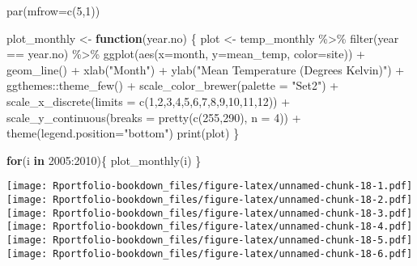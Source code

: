 \documentclass[
]{book}
\newenvironment{Shaded}{\begin{snugshade}}{\end{snugshade}}
\newcommand{\AttributeTok}[1]{\textcolor[rgb]{0.77,0.63,0.00}{#1}}
\newcommand{\ControlFlowTok}[1]{\textcolor[rgb]{0.13,0.29,0.53}{\textbf{#1}}}
\newcommand{\DecValTok}[1]{\textcolor[rgb]{0.00,0.00,0.81}{#1}}
\newcommand{\FunctionTok}[1]{\textcolor[rgb]{0.00,0.00,0.00}{#1}}
\newcommand{\NormalTok}[1]{#1}
\newcommand{\OtherTok}[1]{\textcolor[rgb]{0.56,0.35,0.01}{#1}}
\newcommand{\SpecialCharTok}[1]{\textcolor[rgb]{0.00,0.00,0.00}{#1}}
\newcommand{\StringTok}[1]{\textcolor[rgb]{0.31,0.60,0.02}{#1}}
\begin{document}
\begin{Shaded}
\begin{Highlighting}[]
\FunctionTok{par}\NormalTok{(}\AttributeTok{mfrow=}\FunctionTok{c}\NormalTok{(}\DecValTok{5}\NormalTok{,}\DecValTok{1}\NormalTok{))}

\NormalTok{plot\_monthly }\OtherTok{\textless{}{-}} \ControlFlowTok{function}\NormalTok{(year.no) \{}
\NormalTok{  plot }\OtherTok{\textless{}{-}}\NormalTok{ temp\_monthly }\SpecialCharTok{\%\textgreater{}\%}
    \FunctionTok{filter}\NormalTok{(year }\SpecialCharTok{==}\NormalTok{ year.no) }\SpecialCharTok{\%\textgreater{}\%}
    \FunctionTok{ggplot}\NormalTok{(}\FunctionTok{aes}\NormalTok{(}\AttributeTok{x=}\NormalTok{month, }\AttributeTok{y=}\NormalTok{mean\_temp, }\AttributeTok{color=}\NormalTok{site)) }\SpecialCharTok{+} 
      \FunctionTok{geom\_line}\NormalTok{() }\SpecialCharTok{+}
      \FunctionTok{xlab}\NormalTok{(}\StringTok{"Month"}\NormalTok{) }\SpecialCharTok{+} \FunctionTok{ylab}\NormalTok{(}\StringTok{"Mean Temperature (Degrees Kelvin)"}\NormalTok{) }\SpecialCharTok{+}
\NormalTok{      ggthemes}\SpecialCharTok{::}\FunctionTok{theme\_few}\NormalTok{() }\SpecialCharTok{+} 
      \FunctionTok{scale\_color\_brewer}\NormalTok{(}\AttributeTok{palette =} \StringTok{"Set2"}\NormalTok{) }\SpecialCharTok{+} 
      \FunctionTok{scale\_x\_discrete}\NormalTok{(}\AttributeTok{limits =} \FunctionTok{c}\NormalTok{(}\DecValTok{1}\NormalTok{,}\DecValTok{2}\NormalTok{,}\DecValTok{3}\NormalTok{,}\DecValTok{4}\NormalTok{,}\DecValTok{5}\NormalTok{,}\DecValTok{6}\NormalTok{,}\DecValTok{7}\NormalTok{,}\DecValTok{8}\NormalTok{,}\DecValTok{9}\NormalTok{,}\DecValTok{10}\NormalTok{,}\DecValTok{11}\NormalTok{,}\DecValTok{12}\NormalTok{)) }\SpecialCharTok{+}
      \FunctionTok{scale\_y\_continuous}\NormalTok{(}\AttributeTok{breaks =} \FunctionTok{pretty}\NormalTok{(}\FunctionTok{c}\NormalTok{(}\DecValTok{255}\NormalTok{,}\DecValTok{290}\NormalTok{), }\AttributeTok{n =} \DecValTok{4}\NormalTok{)) }\SpecialCharTok{+}
      \FunctionTok{theme}\NormalTok{(}\AttributeTok{legend.position=}\StringTok{"bottom"}\NormalTok{)}
  \FunctionTok{print}\NormalTok{(plot)}
\NormalTok{  \}}

\ControlFlowTok{for}\NormalTok{(i }\ControlFlowTok{in} \DecValTok{2005}\SpecialCharTok{:}\DecValTok{2010}\NormalTok{)\{}
  \FunctionTok{plot\_monthly}\NormalTok{(i)}
\NormalTok{\}}
\end{Highlighting}
\end{Shaded}

\texttt{[image: Rportfolio-bookdown\_files/figure-latex/unnamed-chunk-18-1.pdf]} \texttt{[image: Rportfolio-bookdown\_files/figure-latex/unnamed-chunk-18-2.pdf]} \texttt{[image: Rportfolio-bookdown\_files/figure-latex/unnamed-chunk-18-3.pdf]} \texttt{[image: Rportfolio-bookdown\_files/figure-latex/unnamed-chunk-18-4.pdf]} \texttt{[image: Rportfolio-bookdown\_files/figure-latex/unnamed-chunk-18-5.pdf]} \texttt{[image: Rportfolio-bookdown\_files/figure-latex/unnamed-chunk-18-6.pdf]}
\end{document}
